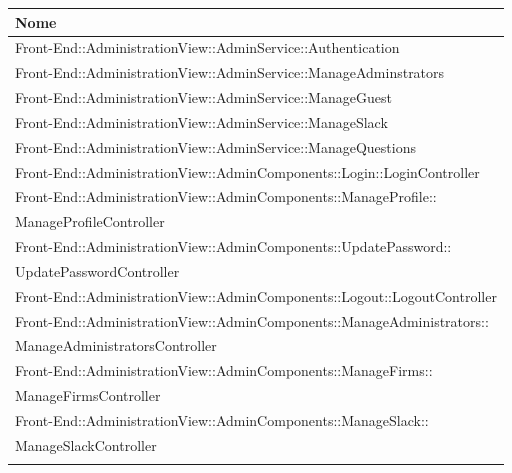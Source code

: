 \documentclass[../DefinizioneDiProdotto.tex]{subfiles}
\begin{document}
			\begin{longtable}[c] { >{\centering\arraybackslash}p{13cm} }
				\toprule
				\centerline{\textbf{Nome}} \\
				\midrule
				Front-End::AdministrationView::AdminService::Authentication \\
				\addlinespace[0.3em]
				\midrule
				\addlinespace[0.3em]
				Front-End::AdministrationView::AdminService::ManageAdminstrators \\
				\addlinespace[0.3em]
				\midrule
				\addlinespace[0.3em]
				Front-End::AdministrationView::AdminService::ManageGuest \\
				\addlinespace[0.3em]
				\midrule
				\addlinespace[0.3em]
				Front-End::AdministrationView::AdminService::ManageSlack \\
				\addlinespace[0.3em]
				\midrule
				\addlinespace[0.3em]
				Front-End::AdministrationView::AdminService::ManageQuestions \\
				\addlinespace[0.3em]
				\midrule
				\addlinespace[0.3em]
				Front-End::AdministrationView::AdminComponents::Login::LoginController \\
				\addlinespace[0.3em]
				\midrule
				\addlinespace[0.3em]
				Front-End::AdministrationView::AdminComponents::ManageProfile::\\ManageProfileController \\
				\addlinespace[0.3em]
				\midrule
				\addlinespace[0.3em]
				Front-End::AdministrationView::AdminComponents::UpdatePassword::\\UpdatePasswordController \\
				\addlinespace[0.3em]
				\midrule
				\addlinespace[0.3em]
				Front-End::AdministrationView::AdminComponents::Logout::LogoutController \\
				\addlinespace[0.3em]
				\midrule
				\addlinespace[0.3em]
				Front-End::AdministrationView::AdminComponents::ManageAdministrators::\\ManageAdministratorsController \\
				\addlinespace[0.3em]
				\midrule
				\addlinespace[0.3em]
				Front-End::AdministrationView::AdminComponents::ManageFirms::\\ManageFirmsController \\
				\addlinespace[0.3em]
				\midrule
				\addlinespace[0.3em]
				Front-End::AdministrationView::AdminComponents::ManageSlack::\\ManageSlackController \\
				\addlinespace[0.3em]
				\midrule
				\addlinespace[0.3em]

\end{longtable}
\end{document}
